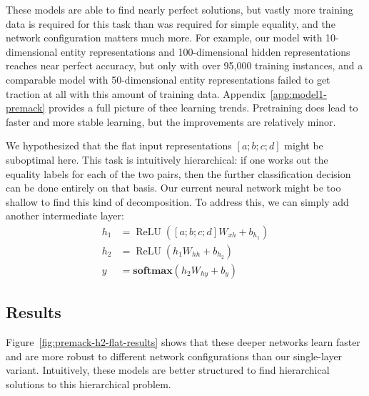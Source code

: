\documentclass[9pt,twocolumn,twoside,lineno]{pnas-new}
\newcommand{\Figref}[1]{Figure~\ref{#1}}
\newcommand{\Appref}[1]{Appendix~\ref{#1}}
\newcommand{\update}[1]{{\color{darkblue}#1}}
\newcommand{\softmax}{\mathbf{softmax}}
\DeclareMathOperator{\ReLU}{ReLU}
\begin{document}
These models are able to find nearly perfect solutions, but vastly more training data is required for this task than was required for simple equality, and the network configuration matters much more. For example, our model with 10-dimensional entity representations and 100-dimensional hidden representations reaches near perfect accuracy, but only with over 95,000 training instances, and a comparable model with 50-dimensional entity representations failed to get traction at all with this amount of training data. \update{\Appref{app:model1-premack} provides a full picture of thee learning trends. Pretraining does lead to faster and more stable learning, but the improvements are relatively minor.}

We hypothesized that the flat input representations $[a;b;c;d]$ might be suboptimal here. This task is intuitively hierarchical: if one works out the equality labels for each of the two pairs, then the further classification decision can be done entirely on that basis. Our current neural network might be too shallow to find this kind of decomposition.  To address this, we can simply add another intermediate layer:
%
\begin{align}
h_{1} &= \ReLU([a;b;c;d]W_{xh} + b_{h_{1}}) \label{eq:x2h1}\\
h_{2} &= \ReLU(h_{1}W_{hh} + b_{h_{2}}) \label{eq:x2h2}\\
y &= \softmax(h_{2}W_{hy} + b_{y}) \label{eq:h2y2}
\end{align}


\subsection*{Results}

\update{\Figref{fig:premack-h2-flat-results} shows that} these deeper networks learn faster and are more robust to different network configurations than our single-layer variant. Intuitively, these models are better structured to find hierarchical solutions to this hierarchical problem.
\end{document}

